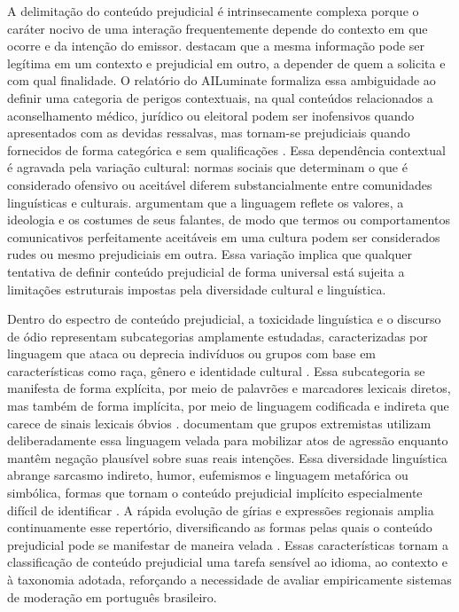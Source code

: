 A delimitação do conteúdo prejudicial é intrinsecamente complexa porque o caráter nocivo de uma interação frequentemente depende do contexto em que ocorre e da intenção do emissor.  destacam que a mesma informação pode ser legítima em um contexto e prejudicial em outro, a depender de quem a solicita e com qual finalidade. O relatório do AILuminate formaliza essa ambiguidade ao definir uma categoria de perigos contextuais, na qual conteúdos relacionados a aconselhamento médico, jurídico ou eleitoral podem ser inofensivos quando apresentados com as devidas ressalvas, mas tornam-se prejudiciais quando fornecidos de forma categórica e sem qualificações \cite{ghosh2025ailuminate}. Essa dependência contextual é agravada pela variação cultural: normas sociais que determinam o que é considerado ofensivo ou aceitável diferem substancialmente entre comunidades linguísticas e culturais.  argumentam que a linguagem reflete os valores, a ideologia e os costumes de seus falantes, de modo que termos ou comportamentos comunicativos perfeitamente aceitáveis em uma cultura podem ser considerados rudes ou mesmo prejudiciais em outra. Essa variação implica que qualquer tentativa de definir conteúdo prejudicial de forma universal está sujeita a limitações estruturais impostas pela diversidade cultural e linguística.

Dentro do espectro de conteúdo prejudicial, a toxicidade linguística e o discurso de ódio representam subcategorias amplamente estudadas, caracterizadas por linguagem que ataca ou deprecia indivíduos ou grupos com base em características como raça, gênero e identidade cultural \cite{elsherief2021latent, fortuna2018}. Essa subcategoria se manifesta de forma explícita, por meio de palavrões e marcadores lexicais diretos, mas também de forma implícita, por meio de linguagem codificada e indireta que carece de sinais lexicais óbvios \cite{elsherief2021latent}.  documentam que grupos extremistas utilizam deliberadamente essa linguagem velada para mobilizar atos de agressão enquanto mantêm negação plausível sobre suas reais intenções. Essa diversidade linguística abrange sarcasmo indireto, humor, eufemismos e linguagem metafórica ou simbólica, formas que tornam o conteúdo prejudicial implícito especialmente difícil de identificar \cite{elsherief2021latent}. A rápida evolução de gírias e expressões regionais amplia continuamente esse repertório, diversificando as formas pelas quais o conteúdo prejudicial pode se manifestar de maneira velada \cite{fortuna2018}. Essas características tornam a classificação de conteúdo prejudicial uma tarefa sensível ao idioma, ao contexto e à taxonomia adotada, reforçando a necessidade de avaliar empiricamente sistemas de moderação em português brasileiro.

